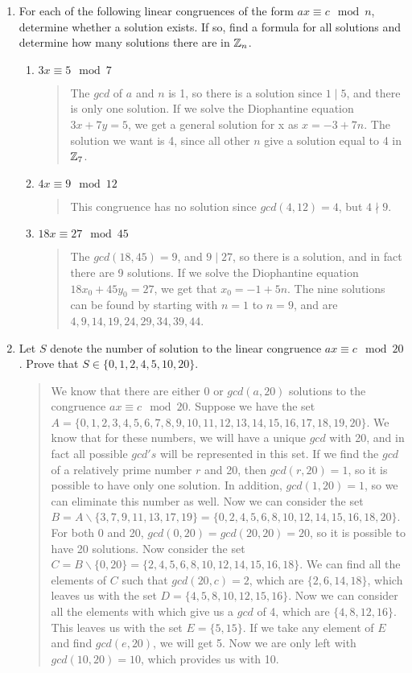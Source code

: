 \documentclass{hw}
\begin{document}

\begin{enumerate}
\item For each of the following linear congruences of the form $ax\equiv c\mod n$, determine whether a
solution exists. If so, find a formula for all solutions and determine how many solutions there are in
$\mathbb{Z}_{n}$.
\begin{enumerate}
\item $3x\equiv 5\mod7$
\begin{quote}
The $gcd$ of $a$ and $n$ is 1, so there is a solution since $1\mid5$, and there is only one solution.
If we solve the Diophantine equation $3x+7y=5$, we get a general solution for x as $x=-3+7n$. The
solution we want is 4, since all other $n$ give a solution equal to 4 in $\mathbb{Z}_{7}$.
\end{quote}
\item $4x\equiv 9\mod12$
\begin{quote}
This congruence has no solution since $gcd(4,12)=4$, but $4\nmid9$.
\end{quote}
\item $18x\equiv 27\mod45$
\begin{quote}
The $gcd(18,45)=9$, and $9\mid27$, so there is a solution, and in fact there are 9 solutions. If we
solve the Diophantine equation $18x_{0}+45y_{0}=27$, we get that $x_{0}=-1+5n$. The nine solutions can
be found by starting with $n=1$ to $n=9$, and are $4,9,14,19,24,29,34,39,44$.
\end{quote}
\end{enumerate}

\item Let $S$ denote the number of solution to the linear congruence $ax\equiv c\mod20$. Prove that
$S\in\{ 0,1,2,4,5,10,20\}$.
\begin{quote}
We know that there are either 0 or $gcd(a,20)$ solutions to the congruence $ax\equiv c\mod20$.
Suppose we have the set $A=\{0,1,2,3,4,5,6,7,8,9,10,11,12,13,14,15,16,17,18,19,20\}$. We know that for
these numbers, we will have a unique $gcd$ with 20, and in fact all possible $gcd's$ will be
represented in this set. If we find the $gcd$ of a relatively prime number $r$ and 20, then
$gcd(r,20)=1$, so it is possible to have only one solution. In addition, $gcd(1,20)=1$, so we can
eliminate this number as well. Now we can consider the set
$B=A\backslash\{3,7,9,11,13,17,19\}=\{0,2,4,5,6,8,10,12,14,15,16,18,20\}$. For both 0 and 20,
$gcd(0,20)=gcd(20,20)=20$, so it is possible to have 20 solutions. Now consider the set
$C=B\backslash\{0,20\}=\{2,4,5,6,8,10,12,14,15,16,18\}$. We can find all the elements of $C$ such that
$gcd(20,c)=2$, which are $\{2,6,14,18\}$, which leaves us with the set $D=\{4,5,8,10,12,15,16\}$.
Now we can consider all the elements with which give us a $gcd$ of 4, which are $\{4,8,12,16\}$.
This leaves us with the set $E=\{5,15\}$. If we take any element of $E$ and find $gcd(e,20)$, we
will get 5. Now we are only left with $gcd(10,20)=10$, which provides us with 10.
\end{quote}


\end{enumerate}
\end{document}
